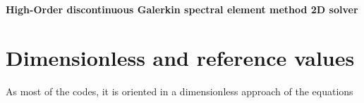\documentclass[10pt,a4paper]{article}
\begin{document}
\begin{center}
	\textbf{High-Order discontinuous Galerkin spectral element method 2D solver}\\
	\hrulefill
	\tableofcontents
	\hrulefill
\end{center}

\section{Dimensionless and reference values}

As most of the codes, it is oriented in a dimensionless approach of the equations
\end{document}
